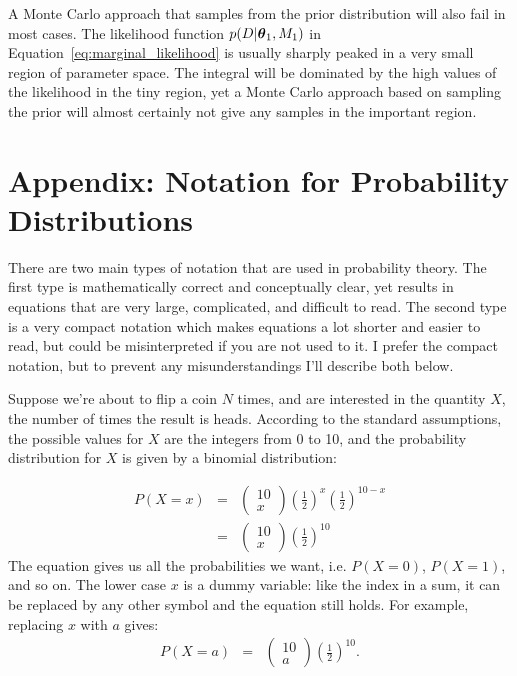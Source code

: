 A Monte Carlo approach that samples from the prior distribution will also fail
in most cases. The likelihood function $p(D | \boldsymbol{\theta}_1, M_1)$ in
Equation~\ref{eq:marginal_likelihood} is usually sharply peaked in a very
small region of parameter space. The integral will be dominated by the high values
of the likelihood in the tiny region, yet a Monte Carlo approach based on
sampling the prior will almost certainly not give any samples in the important
region.

\section{Appendix: Notation for Probability Distributions}
There are two main types of notation that are used in probability theory. The
first type is mathematically correct and conceptually
clear, yet results in equations that are very large, complicated,
and difficult to read.
The second type is a very compact notation which makes equations a lot
shorter and easier to read, but could be misinterpreted if you are not used to
it. I prefer the compact notation, but to prevent any misunderstandings
I'll describe both below.

Suppose we're about to flip a coin $N$ times, and are interested in the
quantity $X$, the number of times the result is heads. According
to the standard assumptions, the possible values for $X$ are the integers from 0
to 10, and the probability distribution for $X$ is given by
a binomial distribution:

\begin{eqnarray}
P(X = x) &=& \left(\begin{array}{cc}10\\ x\end{array}\right)
\left(\frac{1}{2}\right)^x\left(\frac{1}{2}\right)^{10 - x}\\
&=& \left(\begin{array}{cc}10\\ x\end{array}\right)
\left(\frac{1}{2}\right)^{10}
\end{eqnarray}
The equation gives us all the probabilities we want, i.e. $P(X=0)$, $P(X=1)$,
and so on. The lower case $x$ is a dummy variable: like the index in a sum, it
can be replaced by any other symbol and the equation still holds. For example,
replacing $x$ with $a$ gives:
\begin{eqnarray}
P(X = a) &=& \left(\begin{array}{cc}10\\ a\end{array}\right)
\left(\frac{1}{2}\right)^{10}.
\end{eqnarray}

